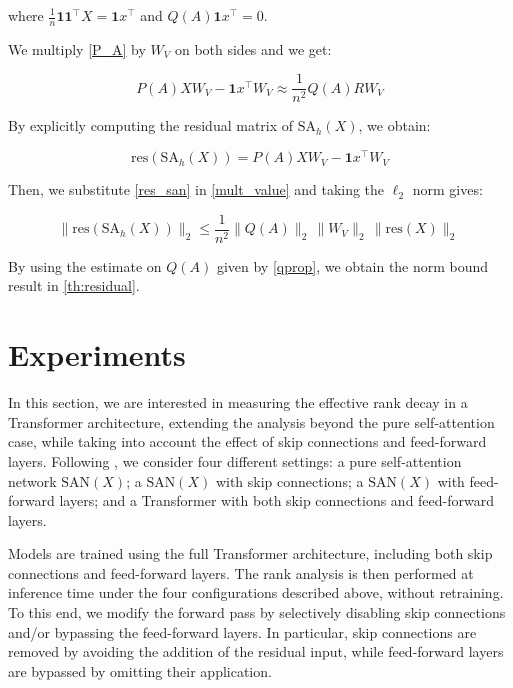 \documentclass{article}
\theoremstyle{definition}
\theoremstyle{plain}
\begin{document}
where $\frac{1}{n}\mathbf{1}\mathbf{1}^\top X=\mathbf{1}x^\top$ and $Q(A)\mathbf{1}x^\top=0$.

We multiply \ref{P_A} by $W_V$ on both sides and we get:

\begin{equation}\label{mult_value}
P(A)XW_V - \mathbf{1}{x^\top}W_V\approx \frac{1}{n^2} Q(A)RW_V
\end{equation}

By explicitly computing the residual matrix of $\mathrm{SA}{_h}(X)$, we obtain:

\begin{equation}\label{res_san}
\mathrm{res}(\mathrm{SA}{_h}(X))
=
P(A)XW_V - \mathbf{1} x^\top W_V
\end{equation}

Then, we substitute \ref{res_san} in \ref{mult_value} and taking the $\ell_2$ norm gives:

\[
\|\mathrm{res}(\mathrm{SA}{_h}(X))\|_2
\le
\frac{1}{n^2}\|Q(A)\|_2\,\|W_V\|_2\,\|\mathrm{res}(X)\|_2\
\]

By using the estimate on $Q(A)$ given by \cref{qprop}, we obtain the {norm bound} result in \cref{th:residual}.

\section{Experiments}
\label{experiments}
 
In this section, we are interested in measuring the effective rank decay in a Transformer architecture, extending the analysis beyond the pure self-attention case, while taking into account the effect of skip connections and feed-forward layers. Following \cite{dong2021attention}, we consider four different settings: a pure self-attention network $\mathrm{SAN}(X)$; a $\mathrm{SAN}(X)$ with skip connections; a $\mathrm{SAN}(X)$ with feed-forward layers; and a Transformer with both skip connections and feed-forward layers. 

Models are trained using the full Transformer architecture, including both skip connections and feed-forward layers. The rank analysis is then performed at inference time under the four configurations described above, without retraining. To this end, we modify the forward pass by selectively disabling skip connections and/or bypassing the feed-forward layers. In particular, skip connections are removed by avoiding the addition of the residual input, while feed-forward layers are bypassed by omitting their application.
\end{document}
